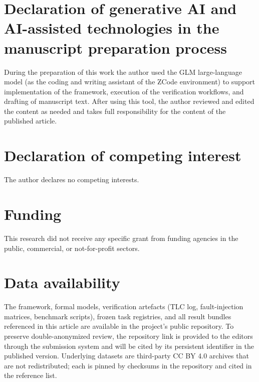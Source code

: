 \documentclass[acmsmall,review,anonymous]{acmart}
\begin{document}
\maketitle










\section*{Declaration of generative AI and AI-assisted technologies in the
manuscript preparation process}
During the preparation of this work the author used the GLM large-language
model (as the coding and writing assistant of the ZCode environment) to
support implementation of the framework, execution of the verification
workflows, and drafting of manuscript text. After using this tool, the author
reviewed and edited the content as needed and takes full responsibility for
the content of the published article.

\section*{Declaration of competing interest}
The author declares no competing interests.

\section*{Funding}
This research did not receive any specific grant from funding agencies in the
public, commercial, or not-for-profit sectors.

\section*{Data availability}
The framework, formal models, verification artefacts (TLC log,
fault-injection matrices, benchmark scripts), frozen task registries, and all
result bundles referenced in this article are available in the project's
public repository. To preserve double-anonymized review, the repository link
is provided to the editors through the submission system and will be cited by
its persistent identifier in the published version. Underlying datasets are
third-party CC BY 4.0 archives that are not redistributed; each is pinned by
checksums in the repository and cited in the reference list.



\end{document}
